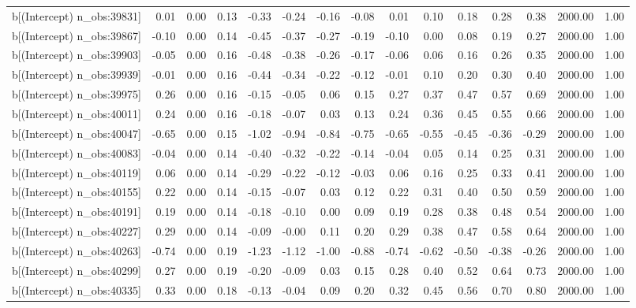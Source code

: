 \begin{table}[ht]
\begin{tabular}{rrrrrrrrrrrrrrr}
  b[(Intercept) n\_obs:39831] & 0.01 & 0.00 & 0.13 & -0.33 & -0.24 & -0.16 & -0.08 & 0.01 & 0.10 & 0.18 & 0.28 & 0.38 & 2000.00 & 1.00 \\ 
  b[(Intercept) n\_obs:39867] & -0.10 & 0.00 & 0.14 & -0.45 & -0.37 & -0.27 & -0.19 & -0.10 & 0.00 & 0.08 & 0.19 & 0.27 & 2000.00 & 1.00 \\ 
  b[(Intercept) n\_obs:39903] & -0.05 & 0.00 & 0.16 & -0.48 & -0.38 & -0.26 & -0.17 & -0.06 & 0.06 & 0.16 & 0.26 & 0.35 & 2000.00 & 1.00 \\ 
  b[(Intercept) n\_obs:39939] & -0.01 & 0.00 & 0.16 & -0.44 & -0.34 & -0.22 & -0.12 & -0.01 & 0.10 & 0.20 & 0.30 & 0.40 & 2000.00 & 1.00 \\ 
  b[(Intercept) n\_obs:39975] & 0.26 & 0.00 & 0.16 & -0.15 & -0.05 & 0.06 & 0.15 & 0.27 & 0.37 & 0.47 & 0.57 & 0.69 & 2000.00 & 1.00 \\ 
  b[(Intercept) n\_obs:40011] & 0.24 & 0.00 & 0.16 & -0.18 & -0.07 & 0.03 & 0.13 & 0.24 & 0.36 & 0.45 & 0.55 & 0.66 & 2000.00 & 1.00 \\ 
  b[(Intercept) n\_obs:40047] & -0.65 & 0.00 & 0.15 & -1.02 & -0.94 & -0.84 & -0.75 & -0.65 & -0.55 & -0.45 & -0.36 & -0.29 & 2000.00 & 1.00 \\ 
  b[(Intercept) n\_obs:40083] & -0.04 & 0.00 & 0.14 & -0.40 & -0.32 & -0.22 & -0.14 & -0.04 & 0.05 & 0.14 & 0.25 & 0.31 & 2000.00 & 1.00 \\ 
  b[(Intercept) n\_obs:40119] & 0.06 & 0.00 & 0.14 & -0.29 & -0.22 & -0.12 & -0.03 & 0.06 & 0.16 & 0.25 & 0.33 & 0.41 & 2000.00 & 1.00 \\ 
  b[(Intercept) n\_obs:40155] & 0.22 & 0.00 & 0.14 & -0.15 & -0.07 & 0.03 & 0.12 & 0.22 & 0.31 & 0.40 & 0.50 & 0.59 & 2000.00 & 1.00 \\ 
  b[(Intercept) n\_obs:40191] & 0.19 & 0.00 & 0.14 & -0.18 & -0.10 & 0.00 & 0.09 & 0.19 & 0.28 & 0.38 & 0.48 & 0.54 & 2000.00 & 1.00 \\ 
  b[(Intercept) n\_obs:40227] & 0.29 & 0.00 & 0.14 & -0.09 & -0.00 & 0.11 & 0.20 & 0.29 & 0.38 & 0.47 & 0.58 & 0.64 & 2000.00 & 1.00 \\ 
  b[(Intercept) n\_obs:40263] & -0.74 & 0.00 & 0.19 & -1.23 & -1.12 & -1.00 & -0.88 & -0.74 & -0.62 & -0.50 & -0.38 & -0.26 & 2000.00 & 1.00 \\ 
  b[(Intercept) n\_obs:40299] & 0.27 & 0.00 & 0.19 & -0.20 & -0.09 & 0.03 & 0.15 & 0.28 & 0.40 & 0.52 & 0.64 & 0.73 & 2000.00 & 1.00 \\ 
  b[(Intercept) n\_obs:40335] & 0.33 & 0.00 & 0.18 & -0.13 & -0.04 & 0.09 & 0.20 & 0.32 & 0.45 & 0.56 & 0.70 & 0.80 & 2000.00 & 1.00 \\ 

\end{tabular}
\end{table}
